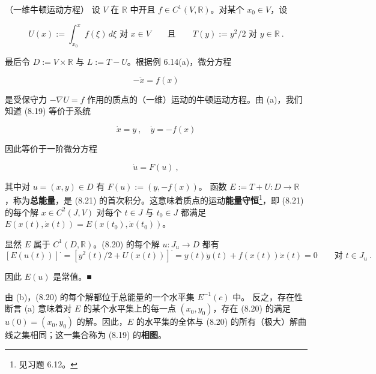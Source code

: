\begin{example}
\begin{items}
\item

（一维牛顿运动方程） 设 $ V $ 在 $ \mathbb{R} $ 中开且 $ f\in C^{1}(V,\mathbb{R}) $。对某个 $ x_{0}\in V $，设

\[
U(x):=\int_{x_{0}}^{x}f(\xi)\,d\xi\text{ 对 }x\in V\qquad\text{且}\qquad T(y):=y^{2}/2\text{ 对 }y\in\mathbb{R} \ .
\]

最后令 $ D:=V\times\mathbb{R} $ 与 $ L:=T-U $。根据例 6.14(a)，微分方程

\begin{equation}
-\ddot{x}=f(x)\tag{8.19}
\end{equation}

是受保守力 $ -\nabla U=f $ 作用的质点的（一维）运动的牛顿运动方程。由 (a)，我们知道 (8.19) 等价于系统

\begin{equation}
\dot{x}=y\ ,\quad\dot{y}=-f(x)\tag{8.20}
\end{equation}

因此等价于一阶微分方程

\begin{equation}
\dot{u}=F(u)\ ,\tag{8.21}
\end{equation}

其中对 $ u=(x,y)\in D $ 有 $ F(u):=(y,-f(x)) $。
函数 $ E:=T+U:D\to\mathbb{R} $，称为\textbf{总能量}，是 (8.21) 的首次积分。这意味着质点的运动\textbf{能量守恒}\footnote{见习题 6.12。}，即 (8.21) 的每个解 $ x\in C^{2}(J,V) $ 对每个 $ t\in J $ 与 $ t_{0}\in J $ 都满足 $ E(x(t),\dot{x}(t))=E(x(t_{0}),\dot{x}(t_{0})) $。

\proofhead
显然 $ E $ 属于 $ C^{1}(D,\mathbb{R}) $。(8.20) 的每个解 $ u:J_{u}\to D $ 都有
\[
\left[E(u(t))\right]^{\cdot}=\left[y^{2}(t)/2+U(x(t))\right]^{\cdot}=y(t)\dot{y}(t)+f(x(t))\dot{x}(t)=0\qquad\text{对 }t\in J_{u} \ .
\]

因此 $ E(u) $ 是常值。\nobreak\hspace{0.35em}■

\item

由 (b)，(8.20) 的每个解都位于总能量的一个水平集 $ E^{-1}(c) $ 中。
反之，存在性断言 (a) 意味着对 $ E $ 的某个水平集上的每一点 $ (x_{0},y_{0}) $，存在 (8.20) 的满足 $ u(0)=(x_{0},y_{0}) $ 的解。因此，$ E $ 的水平集的全体与 (8.20) 的所有（极大）解曲线之集相同；这一集合称为 (8.19) 的\textbf{相图}。

\end{items}



\end{example}

